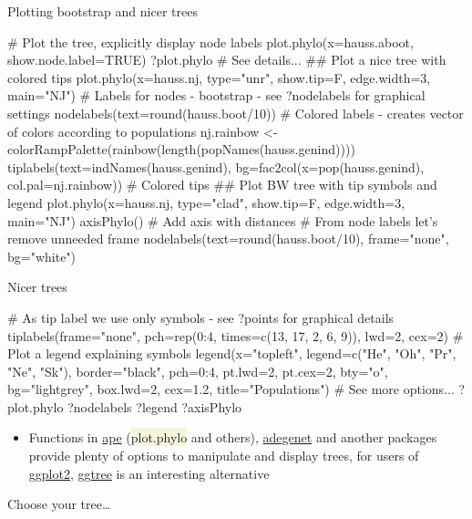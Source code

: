 \documentclass[compress, xelatex, 11pt, xcolor=svgnames, aspectratio=169,
	hyperref={
		bookmarks=true,
		unicode=true,
		colorlinks=true,
		pdftitle={Molecular data in R},
		plainpages=false,
		pdfauthor={Vojtech Zeisek},
		pdfsubject={Course about phylogeny and evolution in R},
		pdfcreator={XeLaTeX},
		pdfkeywords={R, evolution, phylogeny, molecular data},
		linkcolor=Crimson, %
		anchorcolor=Magenta, %
		citecolor=Magenta, %
		filecolor=Magenta, %
		menucolor=Magenta, %
		urlcolor=DodgerBlue, %
		},
	url={hyphens, lowtilde} %
	]{beamer}
\renewcommand{\texttt}[1]{\colorbox{Beige}{{\ttfamily #1}}}
\begin{document}
\begin{frame}[fragile]{Plotting bootstrap and nicer trees}
	\begin{spluscode}
    # Plot the tree, explicitly display node labels
    plot.phylo(x=hauss.aboot, show.node.label=TRUE)
    ?plot.phylo # See details...
    ## Plot a nice tree with colored tips
    plot.phylo(x=hauss.nj, type="unr", show.tip=F, edge.width=3, main="NJ")
    # Labels for nodes - bootstrap - see ?nodelabels for graphical settings
    nodelabels(text=round(hauss.boot/10))
    # Colored labels - creates vector of colors according to populations
    nj.rainbow <- colorRampPalette(rainbow(length(popNames(hauss.genind))))
    tiplabels(text=indNames(hauss.genind), bg=fac2col(x=pop(hauss.genind),
      col.pal=nj.rainbow)) # Colored tips
    ## Plot BW tree with tip symbols and legend
    plot.phylo(x=hauss.nj, type="clad", show.tip=F, edge.width=3, main="NJ")
    axisPhylo() # Add axis with distances
    # From node labels let's remove unneeded frame
    nodelabels(text=round(hauss.boot/10), frame="none", bg="white")
	\end{spluscode}
\end{frame}

\begin{frame}[fragile]{Nicer trees}
	\begin{spluscode}
    # As tip label we use only symbols - see ?points for graphical details
    tiplabels(frame="none", pch=rep(0:4, times=c(13, 17, 2, 6, 9)), lwd=2,
      cex=2)
    # Plot a legend explaining symbols
    legend(x="topleft", legend=c("He", "Oh", "Pr", "Ne", "Sk"),
      border="black", pch=0:4, pt.lwd=2, pt.cex=2, bty="o", bg="lightgrey",
      box.lwd=2, cex=1.2, title="Populations")
    # See more options...
    ?plot.phylo
    ?nodelabels
    ?legend
    ?axisPhylo
	\end{spluscode}
	\begin{itemize}
		\item Functions in \href{https://CRAN.R-project.org/package=ape}{ape} (\texttt{plot.phylo} and others), \href{https://CRAN.R-project.org/package=adegenet}{adegenet} and another packages provide plenty of options to manipulate and display trees, for users of \href{https://CRAN.R-project.org/package=ggplot2}{ggplot2}, \href{https://bioconductor.org/packages/release/bioc/html/ggtree.html}{ggtree} is an interesting alternative
	\end{itemize}
\end{frame}

\begin{frame}{Choose your tree\ldots}
	\begin{center}
		\texttt{[image: nj2.png]}
	\end{center}
\end{frame}
\end{document}
